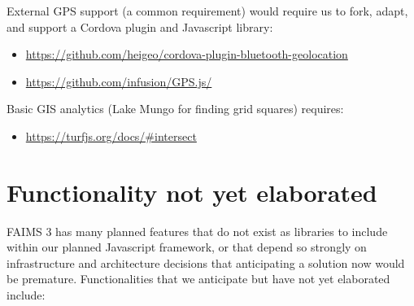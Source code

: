 \documentclass{faims3_report}
\begin{document}
External GPS support (a common requirement) would require us to fork,
adapt, and support a Cordova plugin and Javascript library:

\begin{itemize}
\item \href{https://github.com/heigeo/cordova-plugin-bluetooth-geolocation}{{https://github.com/heigeo/cordova-plugin-bluetooth-geolocation}}
 
\item \href{https://github.com/infusion/GPS.js/}{{https://github.com/infusion/GPS.js/}}
 
\end{itemize}

Basic GIS analytics (Lake Mungo for finding grid squares) requires:

\begin{itemize}
\item \href{https://turfjs.org/docs/\#intersect}{{https://turfjs.org/docs/\#intersect}}
 
\end{itemize}

\section{Functionality not yet
elaborated}

FAIMS 3 has many planned features that do not exist as libraries to
include within our planned Javascript framework, or that depend so
strongly on infrastructure and architecture decisions that anticipating
a solution now would be premature. Functionalities that we anticipate
but have not yet elaborated include:
\end{document}
